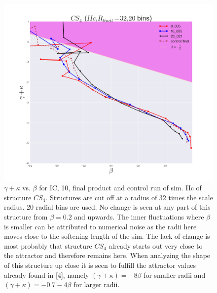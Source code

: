 \begin{figure}[!htbp]
\centering
\includegraphics[width=1.0\linewidth]{img/beta_vs_gamma_plus_kappa_IIc_CS4_Rlimit32.png}
\caption{$\gamma + \kappa$ vs. $\beta$ for IC, 10, final product and control run of sim. IIc of structure $CS_4$. Structures are cut off at a radius of 32 times the scale radius. 20 radial bins are used.
No change is seen at any part of this structure from $\beta = 0.2$ and upwards. The inner fluctuations where $\beta$ is smaller can be attributed to numerical noise as the radii here moves close to the softening length of the sim. The lack of change is most probably that structure $CS_4$ already starts out very close to the attractor and therefore remains here. When analyzing the shape of this structure up close it is seen to fulfill the attractor values already found in [4], namely $(\gamma + \kappa) = -8\beta$ for smaller radii and $(\gamma + \kappa) = -0.7-4\beta$ for larger radii.}
\label{fig:test}
\end{figure}

